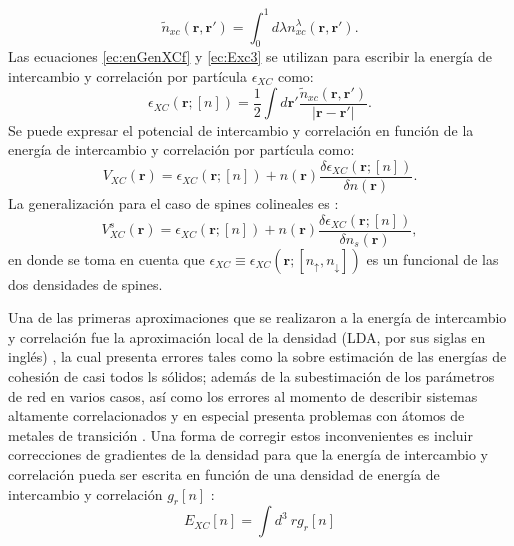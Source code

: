    \begin{equation}
   \widetilde{n }_{xc} (\pmb{r},\pmb{r'}) = \int_{0}^{1} d \lambda n_{xc}^{\lambda} (\pmb{r},\pmb{r'}) \label{ec:avHole}.
   \end{equation}
   Las ecuaciones \ref{ec:enGenXCf} y \ref{ec:Exc3} se utilizan para  escribir la energ\'ia de intercambio y correlaci\'on por part\'icula $\epsilon_{XC} $ como:
   \begin{equation}
   \epsilon_{XC} (\pmb{r}; [n])= \frac{1}{2} \int d \pmb{r'}  \frac{\widetilde{n }_{xc}(\pmb{r},\pmb{r'})}{|\pmb{r}-\pmb{r'}|} \label{ec:densEXC}.
   \end{equation}
     Se puede expresar el potencial de intercambio y correlaci\'on en funci\'on de la energ\'ia de intercambio y correlaci\'on por part\'icula \cite{PhysRevA.29.1648} como:
   \begin{equation}
   V_{XC} (\pmb{r}) = \epsilon_{XC} (\pmb{r}; [n]) + n(\pmb{r}) \frac{\delta \epsilon_{XC} (\pmb{r}; [n])}{\delta n(\pmb{r}) } \label{ec:potXC}.
   \end{equation}  
   La generalizaci\'on para el caso de spines colineales es \cite{Martin-2004}:
   \begin{equation}
   V_{XC}^s (\pmb{r}) = \epsilon_{XC} (\pmb{r}; [n]) + n(\pmb{r}) \frac{\delta \epsilon_{XC} (\pmb{r}; [n])}{\delta n_s(\pmb{r}) } , \label{ec:potXCspin}
   \end{equation}
   en donde se toma en cuenta que $\epsilon_{XC} \equiv \epsilon_{XC} \left(\pmb{r}; \left[ n_{\uparrow}, n_{\downarrow} \right]\right) $ es un funcional de las dos densidades de spines.
\newline
   \par Una de las primeras aproximaciones que se realizaron a la energ\'ia de intercambio y correlaci\'on fue la aproximaci\'on local de la densidad (LDA, por sus siglas en ingl\'es) \cite{PhysRev.140.A1133}, la cual presenta errores tales como la sobre estimaci\'on de  las energ\'ias de cohesi\'on de casi todos ls s\'olidos; adem\'as de la subestimaci\'on de los par\'ametros de red en varios casos, as\'i como  los errores al momento de describir sistemas altamente correlacionados y en especial presenta problemas con \'atomos de metales de transici\'on \cite{MB-2015}. Una forma de corregir estos inconvenientes es incluir correcciones de gradientes de la densidad para que la energ\'ia de intercambio y correlaci\'on pueda ser escrita en funci\'on de una densidad de energ\'ia de intercambio y correlaci\'on $g_{r} [n]$ \cite{MB-2015}:
   \begin{equation}
   E_{XC} [n]= \int d^3~ r g_{r} [n]
   \end{equation}
